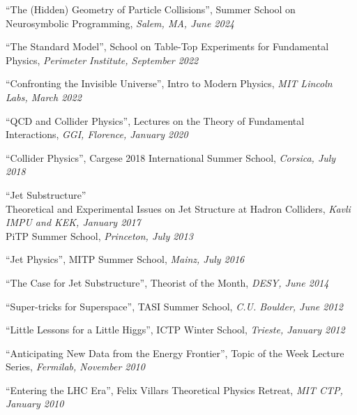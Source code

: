 \bbl

\item ``The (Hidden) Geometry of Particle Collisions'', Summer School on Neurosymbolic Programming, \emph{Salem, MA, June 2024}

\item ``The Standard Model'', School on Table-Top Experiments for Fundamental Physics, \emph{Perimeter Institute, September 2022}

\item ``Confronting the Invisible Universe'', Intro to Modern Physics, \emph{MIT Lincoln Labs, March 2022}

\item ``QCD and Collider Physics'', Lectures on the Theory of Fundamental Interactions, \emph{GGI, Florence, January 2020}

\item ``Collider Physics'', Cargese 2018 International Summer School, \emph{Corsica, July 2018}

\item ``Jet Substructure''
\\ Theoretical and Experimental Issues on Jet Structure at Hadron Colliders, \emph{Kavli IMPU and KEK, January 2017}
\\ PiTP Summer School, \emph{Princeton, July 2013}

\item ``Jet Physics'', MITP Summer School, \emph{Mainz, July 2016}

\item ``The Case for Jet Substructure'', Theorist of the Month, \emph{DESY, June 2014}

\item ``Super-tricks for Superspace'', TASI Summer School, \emph{C.U. Boulder, June 2012}

\item ``Little Lessons for a Little Higgs'', ICTP Winter School, \emph{Trieste, January 2012}

\item ``Anticipating New Data from the Energy Frontier'', Topic of the Week Lecture Series, \emph{Fermilab, November 2010}

\item ``Entering the LHC Era'', Felix Villars Theoretical Physics Retreat, \emph{MIT CTP, January 2010}

\el
